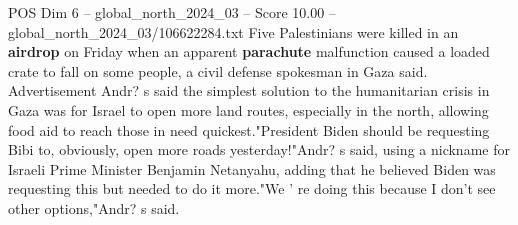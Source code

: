 \begin{textsample}{POS Dim 6 – global\_north\_2024\_03 – Score 10.00 – global\_north\_2024\_03/106622284.txt}
Five Palestinians were killed in an \textbf{airdrop} on Friday when an apparent \textbf{parachute} malfunction caused a loaded crate to fall on some people, a civil defense spokesman in Gaza said.
Advertisement Andr? s said the simplest solution to the humanitarian crisis in Gaza was for Israel to open more land routes, especially in the north, allowing food aid to reach those in need quickest."President Biden should be requesting Bibi to, obviously, open more roads yesterday!"Andr? s said, using a nickname for Israeli Prime Minister Benjamin Netanyahu, adding that he believed Biden was requesting this but needed to do it more."We ' re doing this because I don't see other options,"Andr? s said.

\end{textsample}

